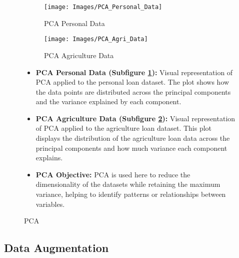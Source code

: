 \documentclass[a4paper]{article}
\begin{document}
\hspace{1cm}
\begin{figure}[H]
	\centering
	\begin{subfigure}{0.5\textwidth}
		\centering
		\texttt{[image: Images/PCA\_Personal\_Data]} 
		\caption{PCA Personal Data}
		\label{fig:subfig1}
	\end{subfigure}%
	\begin{subfigure}{0.5\textwidth}
		\centering
		\texttt{[image: Images/PCA\_Agri\_Data]} 
		\caption{PCA Agriculture Data}
		\label{fig:subfig2}
	\end{subfigure}
	\caption{PCA}
	\label{fig:mainfig}
	\vspace{1em} %
	 \begin{minipage}{0.8\textwidth} %
		\begin{itemize}
			\item \textbf{PCA Personal Data (Subfigure \ref{fig:subfig1}):} Visual representation of PCA applied to the personal loan dataset. The plot shows how the data points are distributed across the principal components and the variance explained by each component.
			\item \textbf{PCA Agriculture Data (Subfigure \ref{fig:subfig2}):} Visual representation of PCA applied to the agriculture loan dataset. This plot displays the distribution of the agriculture loan data across the principal components and how much variance each component explains.
			\item \textbf{PCA Objective:} PCA is used here to reduce the dimensionality of the datasets while retaining the maximum variance, helping to identify patterns or relationships between variables.
		\end{itemize}
	\end{minipage}
\end{figure}


\subsection{Data Augmentation}
\end{document}
